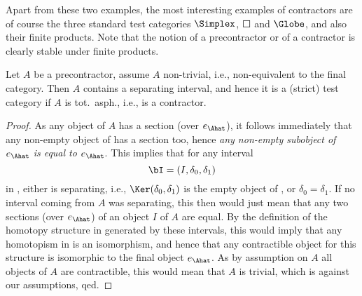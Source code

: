 Apart from these two examples, the most interesting examples of
contractors are of course the three standard test categories
$\Simplex$, $\Square$ and $\Globe$, and also their finite
products. Note that the notion of a precontractor or of a contractor
is clearly stable under finite products.
\begin{propositionnum}\label{prop:95.3}
  Let $A$ be a precontractor, assume $A$ non-trivial, i.e.,
  non-equivalent to the final category. Then $A$ contains a separating
  interval, and hence it is a \textup(strict\textup) test category if
  $A$ is tot.\ asph., i.e., is a contractor.
\end{propositionnum}
\begin{proof}
  As any object of $A$ has a section (over $e_\Ahat$), it follows
  immediately that any non-empty object of \Ahat{} has a section too,
  hence \emph{any non-empty subobject of $e_\Ahat$ is equal to
    $e_\Ahat$}. This implies that for any interval
  \[\bI=(I,\delta_0,\delta_1)\]
  in \Ahat, either \bI{} is separating, i.e.,
  $\Ker(\delta_0,\delta_1)$ is the empty object of \Ahat, or
  $\delta_0=\delta_1$. If no interval coming from $A$ was separating,
  this then would just mean that any two sections (over $e_\Ahat$) of
  an object $I$ of $A$ are equal. By the definition of the homotopy
  structure in \Ahat{} generated by these intervals, this would imply
  that any homotopism in \Ahat{} is an isomorphism, and hence that any
  contractible object for this structure is isomorphic to the final
  object $e_\Ahat$. As by assumption on $A$ all objects of $A$ are
  contractible, this would mean that $A$ is trivial, which is against
  our assumptions, qed.
\end{proof}
